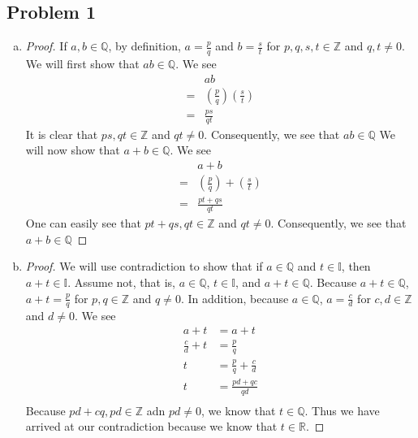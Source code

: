 \documentclass[12pt]{article}
\begin{document}
\subsection*{Problem 1}
\begin{enumerate}[a).]
    \item {
    \begin{proof}
        If $a, b \in \mathbb{Q}$, by definition, $a =\frac{p}{q}$ and $b = \frac{s}{t}$ for $p,q,s,t \in \mathbb{Z}$ and $q,t \ne 0$. 
        We will first show that $ab \in \mathbb{Q}$.
        We see
        \begin{align*}
            &ab\\
            =&(\frac{p}{q})(\frac{s}{t})\\
            =&\frac{ps}{qt}
        \end{align*}
        It is clear that $ps, qt\in \mathbb{Z}$ and $qt \ne 0$. 
        Consequently, we see that $ab \in \mathbb{Q}$
        We will now show that $a+b \in \mathbb{Q}$.
        We see
        \begin{align*}
            &a+b\\
            =&(\frac{p}{q})+(\frac{s}{t})\\
            =&\frac{pt+qs}{qt}
        \end{align*}
        One can easily see that $pt+qs, qt\in \mathbb{Z}$ and $qt \ne 0$. 
        Consequently, we see that $a+b \in \mathbb{Q}$
        
    \end{proof}
    }
    
    \item {
        \begin{proof}
            We will use contradiction to show that if $a \in \mathbb{Q}$ and $t \in \mathbb{I}$, then $a+t \in \mathbb{I}$. 
            Assume not, that is, $a \in \mathbb{Q}$, $t \in \mathbb{I}$, and $a+t \in \mathbb{Q}$. 
            Because $a+t \in \mathbb{Q}$, $a+t = \frac{p}{q}$ for $p,q \in \mathbb{Z}$ and $q \ne 0$. 
            In addition, because $a \in \mathbb{Q}$, $a = \frac{c}{d}$ for $c, d \in \mathbb{Z}$ and $d \ne 0$. 
            We see 
            \begin{align*}
                a + t &= a + t\\
                \frac{c}{d} + t &= \frac{p}{q}\\
                t &= \frac{p}{q}+\frac{c}{d}\\
                t &= \frac{pd+qc}{qd}\\
            \end{align*}
            Because $pd + cq, pd \in \mathbb{Z}$ adn $pd \ne 0$, we know that $t \in \mathbb{Q}$.
            Thus we have arrived at our contradiction because we know that $t \in \mathbb{R}$. 
        \end{proof}

}
\end{enumerate}
\end{document}
